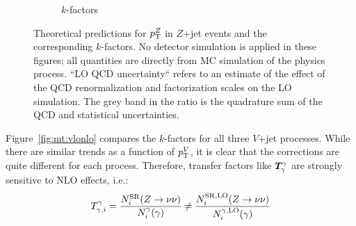 \begin{figure}[]
\begin{center}
\begin{subfigure}[t]{0.49\textwidth}
            \caption{$k$-factors}
        \end{subfigure}
        \caption{Theoretical predictions for $p_\mathrm{T}^Z$ in $Z$+jet events and the corresponding $k$-factors.
                 No detector simulation is applied in these figures; all quantities are directly from MC simulation of the physics process.
                 ``LO QCD uncertainty`` refers to an estimate of the effect of the QCD renormalization and factorization scales on the LO simulation.
                 The grey band in the ratio is the quadrature sum of the QCD and statistical uncertainties.}
        \label{fig:mt:zlonlo}
    \end{center}
\end{figure}

Figure~\ref{fig:mt:vlonlo} compares the $k$-factors for all three $V$+jet processes.
While there are similar trends as a function of $p_\mathrm{T}^V$, it is clear that the corrections are quite different for each process.
Therefore, transfer factors like $\bm{T}^{\gamma}_{\gamma}$ are strongly sensitive to NLO effects, i.e.:
\begin{equation}
    {T}^{\gamma}_{\gamma,i} = \frac{N^\mathrm{SR}_i(Z\rightarrow\nu\nu)}{N_i^\gamma(\gamma)} \neq \frac{N^\mathrm{SR,LO}_i(Z\rightarrow\nu\nu)}{N_i^{\gamma,\mathrm{LO}}(\gamma)}
\end{equation}

